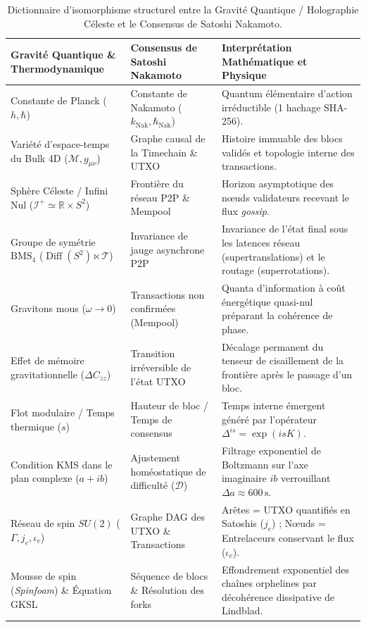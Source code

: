 \documentclass[10pt,twocolumn,a4paper]{article}
\theoremstyle{plain}
\theoremstyle{definition}
\theoremstyle{remark}
\newcommand{\kNak}{k_{\text{Nak}}}
\newcommand{\scri}{\mathcal{I}}
\newcommand{\Diff}{\operatorname{Diff}}
\begin{document}
\begin{table}[t]
\centering
\caption{Dictionnaire d'isomorphisme structurel entre la Gravité Quantique / Holographie Céleste et le Consensus de Satoshi Nakamoto.}
\label{tab:isomorphism}
\renewcommand{\arraystretch}{1.22}
\footnotesize
\begin{tabular}{@{}p{5.1cm}p{5.1cm}p{6.6cm}@{}}
\toprule
\textbf{Gravité Quantique \& Thermodynamique} & \textbf{Consensus de Satoshi Nakamoto} & \textbf{Interprétation Mathématique et Physique} \\
\midrule
Constante de Planck ($h, \hbar$) & Constante de Nakamoto ($\kNak, \hbar_{\text{Nak}}$) & Quantum élémentaire d'action irréductible (1 hachage SHA-256). \\
Variété d'espace-temps du Bulk 4D ($\mathcal{M}, g_{\mu\nu}$) & Graphe causal de la Timechain \& UTXO & Histoire immuable des blocs validés et topologie interne des transactions. \\
Sphère Céleste / Infini Nul ($\scri^+ \simeq \mathbb{R} \times S^2$) & Frontière du réseau P2P \& Mempool & Horizon asymptotique des nœuds validateurs recevant le flux \textit{gossip}. \\
Groupe de symétrie $\text{BMS}_4$ ($\Diff(S^2) \ltimes \mathcal{T}$) & Invariance de jauge asynchrone P2P & Invariance de l'état final sous les latences réseau (supertranslations) et le routage (superrotations). \\
Gravitons mous ($\omega \to 0$) & Transactions non confirmées (Mempool) & Quanta d'information à coût énergétique quasi-nul préparant la cohérence de phase. \\
Effet de mémoire gravitationnelle ($\Delta C_{zz}$) & Transition irréversible de l'état UTXO & Décalage permanent du tenseur de cisaillement de la frontière après le passage d'un bloc. \\
Flot modulaire / Temps thermique ($s$) & Hauteur de bloc / Temps de consensus & Temps interne émergent généré par l'opérateur $\Delta^{is} = \exp(isK)$. \\
Condition KMS dans le plan complexe ($a + ib$) & Ajustement homéostatique de difficulté ($\mathcal{D}$) & Filtrage exponentiel de Boltzmann sur l'axe imaginaire $ib$ verrouillant $\Delta a \approx 600\,\text{s}$. \\
Réseau de spin $SU(2)$ ($\Gamma, j_e, \iota_v$) & Graphe DAG des UTXO \& Transactions & Arêtes = UTXO quantifiés en Satoshis ($j_e$) ; Nœuds = Entrelaceurs conservant le flux ($\iota_v$). \\
Mousse de spin (\textit{Spinfoam}) \& Équation GKSL & Séquence de blocs \& Résolution des forks & Effondrement exponentiel des chaînes orphelines par décohérence dissipative de Lindblad. \\

\end{tabular}
\end{table}
\end{document}
